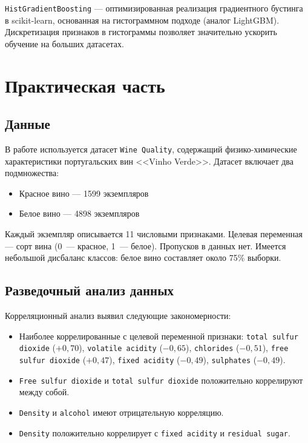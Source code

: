\documentclass{itmo}
\begin{document}
\texttt{HistGradientBoosting} --- оптимизированная реализация градиентного бустинга в scikit-learn, основанная на гистограммном подходе (аналог LightGBM). Дискретизация признаков в гистограммы позволяет значительно ускорить обучение на больших датасетах.

\chapter{Практическая часть}

\section{Данные}

В работе используется датасет \texttt{Wine Quality}, содержащий физико-химические характеристики португальских вин <<Vinho Verde>>. Датасет включает два подмножества:
\begin{itemize}
	\item Красное вино --- 1599 экземпляров
	\item Белое вино --- 4898 экземпляров
\end{itemize}

Каждый экземпляр описывается 11 числовыми признаками.
Целевая переменная --- сорт вина (0~--- красное, 1~--- белое).
Пропусков в данных нет.
Имеется небольшой дисбаланс классов: белое вино составляет около 75\% выборки.

\section{Разведочный анализ данных}

Корреляционный анализ выявил следующие закономерности:
\begin{itemize}
	\item Наиболее коррелированные с целевой переменной признаки: \texttt{total sulfur dioxide} ($+0{,}70$), \texttt{volatile acidity} ($-0{,}65$), \texttt{chlorides} ($-0{,}51$), \texttt{free sulfur dioxide} ($+0{,}47$), \texttt{fixed acidity} ($-0{,}49$), \texttt{sulphates} ($-0{,}49$).
	\item \texttt{Free sulfur dioxide} и \texttt{total sulfur dioxide} положительно коррелируют между собой.
	\item \texttt{Density} и \texttt{alcohol} имеют отрицательную корреляцию.
	\item \texttt{Density} положительно коррелирует с \texttt{fixed acidity} и \texttt{residual sugar}.
\end{itemize}
\end{document}
